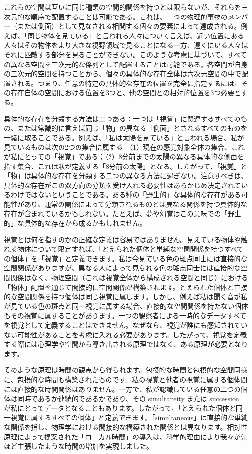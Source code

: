 \documentclass[a4paper,11pt,openany]{ltjsbook}
\begin{document}
これらの空間は互いに同じ種類の空間的関係を持つとは限らないが、それらを三次元的な順序で配置することは可能である。これは、一つの物理的事物のメンバー（または側面）として見なされる相関する個々の要素によって達成される。例えば、「同じ物体を見ている」と言われる人々について言えば、近い位置にある人々はその物体をより大きな視野領域で見ることになる一方、遠くにいる人々はそれに匹敵する部分を見ることができない。このような考慮に基づいて、すべての異なる空間を三次元的な係列として配置することは可能である。各空間が自身の三次元的空間を持つことから、個々の具体的な存在全体は六次元空間の中で配置される。つまり、任意の特定の具体的な存在の位置を完全に指定するには、その存在自体の空間における位置を3つと、他の空間との相対的位置を3つ必要とする。

具体的な存在を分類する方法は二つある：一つは「視覚」に関連するすべてのもの、または常識的に言えば同じ「物」の異なる「側面」とされるすべてのものを一緒に取ることである。例えば、「私は太陽を見ている」と言われる場合、私が見ているものは次の2つの集合に属する：（1）現在の感覚対象全体の集合、これが私にとっての「視覚」である；（2）8分前までの太陽の異なる具体的な側面を指す集合、これは私が定義する「8分前の太陽」となる。したがって、「視覚」と「物」は具体的な存在を分類する二つの異なる方法に過ぎない。注意すべきは、具体的な存在がこの双方向の分類を受け入れる必要性はあらかじめ決定されているわけではないということである。ある種の「野生的」な具体的な存在がある可能性があり、通常の関係によって分類されるものとは異なる関係を持つ具体的な存在が含まれているかもしれない。たとえば、夢や幻覚はこの意味での「野生的」な具体的な存在から成るかもしれません。


視覚とは何を指すのかの正確な定義は容易ではありません。見えている物体や触れる物体について限定すれば、「とえられた個体と単純な空間関係を持つすべての個体」を「視覚」と定義できます。私は今見ている色の斑点同士には直接的な空間関係がありますが、異なる人によって見られる色の斑点同士には直接的な空間関係はなく、物理空間（これは視覚全体から構成される空間と同じ）における「物体」配置を通じて間接的に空間関係が構築されます。とえられた個体と直接的な空間関係を持つ個体は同じ視覚に属します。しかし、例えば私は聞く音が私が見ている色の斑点と同一視覚に属する場合、直接的な空間関係を持たない個体もその視覚に属することがあります。一つの観察者による一時的なデータすべてを視覚として定義することはできません。なぜなら、視覚が誰にも感知されていない可能性があることを考慮に入れる必要があります。したがって、視覚を定義する際には心理学や空間から導き出される原理ではなく、ある原理が必要となります。

そのような原理は時間の観点から得られます。包摂的な時間と包摂的な空間同様に、包摂的な時間も構築されたものです。私の視覚と他者の視覚に属する個体間には直接的な時間関係はありません。一方で、私が認識している任意の二つの個体は同時であるか連続的であるかであり、その simultaneity または succession が私にとってデータとなることもあります。したがって、「とえられた個体と同一視覚に属するすべての個体」と定義できます。「simultaneous」は直接的な単純な関係を指し、物理学における間接的な構築された関係とは異なります。相対性原理によって提案された「ローカル時間」の導入は、科学的理由により我々が先ほど主張したような時間の増加を実現しました。
\end{document}
